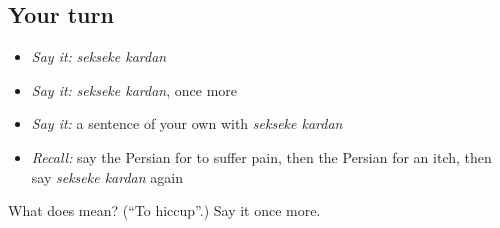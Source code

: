\subsection*{Your turn}
\begin{itemize}
\raggedright
  \item \emph{Say it:} \emph{sekseke kardan}
  \item \emph{Say it:} \emph{sekseke kardan}, once more
  \item \emph{Say it:} a sentence of your own with \emph{sekseke kardan}
  \item \emph{Recall:} say the Persian for to suffer pain, then the Persian for an itch, then say \emph{sekseke kardan} again
\end{itemize}

\begin{tcolorbox}[breakable,colback=teal!4,colframe=teal!35!black,title={Before you move on}]
What does   mean? (\textquotedblleft{}To hiccup\textquotedblright{}.) Say it once more.
\end{tcolorbox}
